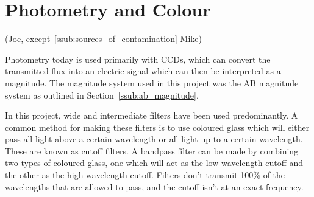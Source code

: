 
\section{Photometry and Colour} %
\label{sec:Photometry_Colour}
(Joe, except~\ref{ssub:sources_of_contamination} Mike)

	Photometry today is used primarily with CCDs, which can convert the transmitted flux into an electric signal which can then be interpreted as a magnitude. The magnitude system used in this project was the AB magnitude system as outlined in Section~\ref{ssub:ab_magnitude}.

	In this project, wide and intermediate filters have been used predominantly. A common method for making these filters is to use coloured glass which will either pass all light above a certain wavelength or all light up to a certain wavelength. These are known as cutoff filters. A bandpass filter can be made by combining two types of coloured glass, one which will act as the low wavelength cutoff and the other as the high wavelength cutoff. Filters don't transmit 100\% of the wavelengths that are allowed to pass, and the cutoff isn't at an exact frequency.

